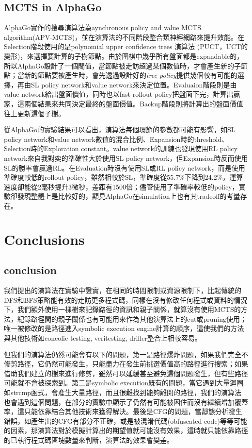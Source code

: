 \documentclass[12pt,a4paper,oneside]{book}
\begin{document}
\section{MCTS in AlphaGo}

AlphaGo實作的搜尋演算法為aynchronous policy and value MCTS algorithm(APV-MCTS)，並在演算法的不同階段整合類神經網路來提升效能。在Selection階段使用的是polynomial upper confidence trees 演算法 (PUCT，UCT的變形)，來選擇要計算的子樹節點。由於圍棋中幾乎所有盤面都是expandable的，所以AlphaGo設計了一個閥值，當節點被走訪超過某個數值時，才會產生新的子節點；當新的節點要被產生時，會先透過設計好的\textit{tree policy}提供幾個較有可能的選擇，再由SL policy network和value network來決定位置。Evaluaion階段則是由value network給出盤面價值，同時也以fast rollout policy把盤面下完，計算出贏家，這兩個結果來共同決定最終的盤面價值。Backup階段則將計算出的盤面價值往上更新這個子樹。

從AlphaGo的實驗結果可以看出，演算法每個環節的參數都可能有影響，如SL policy network和value network數值的混合比例、Expansion時的threshold、Selection時的Exploration constant。value network的訓練也發現使用RL policy network來自我對奕的準確性大於使用SL policy network，但Expansion時反而使用SL的勝率會贏過RL。在Evaluation時沒有使用SL或RL policy network，而是使用準確度較低的rollout policy，雖然相較於SL，準確度從55.7\%下降到24.2\%，運算速度卻能從2毫秒提升3微秒，差距有1500倍；儘管使用了準確率較低的policy，實驗卻發現整體上是比較好的，顯見AlphaGo在simulation上也有其tradeoff的考量存在。

\chapter{Conclusions}

\section{conclusion}

我們提出的演算法在實驗中證實，在相同的時間限制或資源限制下，比起傳統的DFS和BFS策略能有效的走訪更多程式碼，同樣在沒有修改任何程式或資料的情況下，我們額外使用一棵樹來記錄路徑的資訊和親子關係，就算沒有使用MCTS的方法，紀錄路徑間的親子關係也有可能用來作為其他演算法上的cut或pruning使用；唯一被修改的是路徑進入symbolic execution engine計算的順序，這使我們的方法與其他技術如concolic testing\cite{sen2007concolic}, veritesting\cite{Veritesting}, driller\cite{stephens2016driller}整合上相較容易。

但我們的演算法仍然可能會有以下的問題，第一是路徑爆炸問題，如果我們完全不修剪路徑，它仍然可能發生，只能盡力在發生前挑選價值高的路徑進行搜索；如果借助我們建立的樹來進行修剪，雖然可以延緩甚至避免這個問題發生，但有些路徑可能就不會被探索到。第二是symbolic execution既有的問題，當它遇到大量迴圈如strcmp函式，會產生大量路徑，而且很難找到能夠離開的路徑，我們的演算法也會遇到這個問題，在部分的實驗中顯示了仍然有可能被困住而沒有繼續增加覆蓋率，這只能依靠結合其他技術來獲得解決。最後是CFG的問題，當靜態分析發生錯誤，如產生出的CFG有部分不正確，或是被混淆代碼(obfuscated code)等等可能的因素，那演算法對於模擬計算出的期望值就可能沒有效果，這時就只能依靠路徑的已執行程式碼區塊數量來判斷，演算法的效果會變差。
\end{document}
